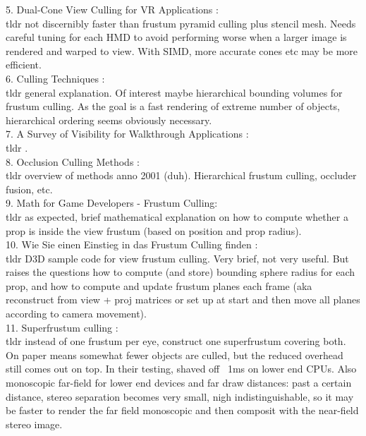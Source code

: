 5. Dual-Cone View Culling for \gls{VR} Applications \cite{Hale.2018}: \\
tldr not discernibly faster than frustum pyramid culling plus stencil mesh. Needs careful tuning for each HMD to avoid performing worse when a larger image is rendered and warped to view. With SIMD, more accurate cones etc may be more efficient.\\

6. Culling Techniques \cite{ITCS.Subramanian}: \\
tldr general explanation. Of interest maybe hierarchical bounding volumes for frustum culling. As the goal is a fast rendering of extreme number of objects, hierarchical ordering seems obviously necessary.\\

7. A Survey of Visibility for Walkthrough Applications \cite{CohenOr.2003}: \\
tldr .\\

8. Occlusion Culling Methods \cite{Hey.2001}: \\
tldr overview of methods anno 2001 (duh). Hierarchical frustum culling, occluder fusion, etc.\\

9. Math for Game Developers - Frustum Culling\cite{Rodriguez.2013}: \\
tldr as expected, brief mathematical explanation on how to compute whether a prop is inside the view frustum (based on position and prop radius).\\

10. Wie Sie einen Einstieg in das Frustum Culling finden \cite{VisCircleGmbH.}: \\
tldr D3D sample code for view frustum culling. Very brief, not very useful. But raises the questions how to compute (and store) bounding sphere radius for each prop, and how to compute and update frustum planes each frame (aka reconstruct from view + proj matrices or set up at start and then move all planes according to camera movement).\\

11. Superfrustum culling \cite{Whiting.2017}: \\
tldr instead of one frustum per eye, construct one superfrustum covering both. On paper means somewhat fewer objects are culled, but the reduced overhead still comes out on top. In their testing, shaved off ~1ms on lower end CPUs. Also monoscopic far-field for lower end devices and far draw distances: past a certain distance, stereo separation becomes very small, nigh indistinguishable, so it may be faster to render the far field monoscopic and then composit with the near-field stereo image.\\

